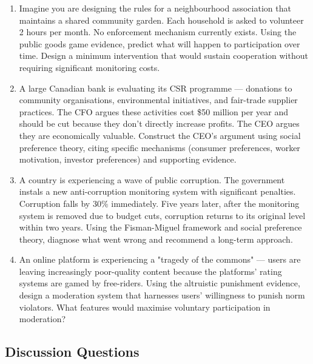 \documentclass[12pt, letterpaper]{article}
\begin{document}
\begin{enumerate}
\item Imagine you are designing the rules for a neighbourhood association that maintains a shared community garden. Each household is asked to volunteer 2 hours per month. No enforcement mechanism currently exists. Using the public goods game evidence, predict what will happen to participation over time. Design a minimum intervention that would sustain cooperation without requiring significant monitoring costs.


\item A large Canadian bank is evaluating its CSR programme --- donations to community organisations, environmental initiatives, and fair-trade supplier practices. The CFO argues these activities cost \$50 million per year and should be cut because they don't directly increase profits. The CEO argues they are economically valuable. Construct the CEO's argument using social preference theory, citing specific mechanisms (consumer preferences, worker motivation, investor preferences) and supporting evidence.

\item A country is experiencing a wave of public corruption. The government instals a new anti-corruption monitoring system with significant penalties. Corruption falls by 30\% immediately. Five years later, after the monitoring system is removed due to budget cuts, corruption returns to its original level within two years. Using the Fisman-Miguel framework and social preference theory, diagnose what went wrong and recommend a long-term approach.
\newpage
\item An online platform is experiencing a "tragedy of the commons" --- users are leaving increasingly poor-quality content because the platforms' rating systems are gamed by free-riders. Using the altruistic punishment evidence, design a moderation system that harnesses users' willingness to punish norm violators. What features would maximise voluntary participation in moderation?
\end{enumerate}


\subsection{Discussion Questions}
\end{document}

